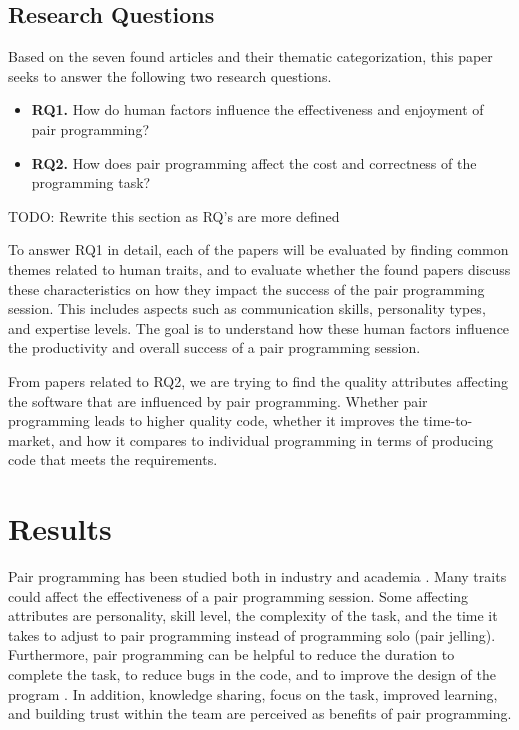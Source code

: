 \documentclass[conference]{IEEEtran}
\newcommand{\todo}[1]{{\color{red} TODO: {#1}}}
\begin{document}
\subsection{Research Questions}

Based on the seven found articles and their thematic categorization, this paper seeks to answer the following two research questions.

\begin{itemize}
    \item \textbf{RQ1.} How do human factors influence the effectiveness and enjoyment of pair programming?
    \item \textbf{RQ2.} How does pair programming affect the cost and correctness of the programming task?
\end{itemize}

\todo{Rewrite this section as RQ's are more defined}

To answer RQ1 in detail, each of the papers will be evaluated by finding common themes related to human traits, and to evaluate whether the found papers discuss these characteristics on how they impact the success of the pair programming session. This includes aspects such as communication skills, personality types, and expertise levels. The goal is to understand how these human factors influence the productivity and overall success of a pair programming session.

From papers related to RQ2, we are trying to find the quality attributes affecting the software that are influenced by pair programming. Whether pair programming leads to higher quality code, whether it improves the time-to-market, and how it compares to individual programming in terms of producing code that meets the requirements. 

\section{Results}

Pair programming has been studied both in industry and academia \cite{Williams2000Strengthening, 10.1145/1414004.1414026, Hannay2009effectiveness}. Many traits could affect the effectiveness of a pair programming session. Some affecting attributes are personality, skill level, the complexity of the task, and the time it takes to adjust to pair programming instead of programming solo (pair jelling). Furthermore, pair programming can be helpful to reduce the duration to complete the task, to reduce bugs in the code, and to improve the design of the program \cite{10.1145/2652524.2652529}. In addition, knowledge sharing, focus on the task, improved learning, and building trust within the team are perceived as benefits of pair programming.
\end{document}
